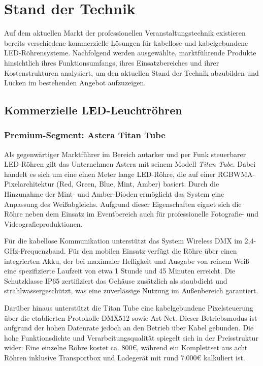 \chapter{Stand der Technik}
\label{chap:stand-der-technik}

Auf dem aktuellen Markt der professionellen Veranstaltungstechnik existieren 
bereits verschiedene kommerzielle Lösungen für kabellose und kabelgebundene LED-Röhrensysteme. 
Nachfolgend werden ausgewählte, marktführende Produkte 
hinsichtlich ihres Funktionsumfangs, ihres Einsatzbereiches und ihrer 
Kostenstrukturen analysiert, um den aktuellen Stand der Technik abzubilden 
und Lücken im bestehenden Angebot aufzuzeigen. 

\section{Kommerzielle LED-Leuchtröhren}
\label{sec:kommerzielle-led-leuchtroehren}

\subsection{Premium-Segment: Astera Titan Tube}
Als gegenwärtiger Marktführer im Bereich autarker und per Funk steuerbarer 
LED-Röhren gilt das Unternehmen Astera mit seinem Modell \textit{Titan Tube}. 
Dabei handelt es sich um eine einen Meter lange LED-Röhre, die auf einer 
RGBWMA-Pixelarchitektur (Red, Green, Blue, Mint, Amber) basiert. Durch die 
Hinzunahme der Mint- und Amber-Dioden ermöglicht das System eine
Anpassung des Weißabgleichs. 
Aufgrund dieser Eigenschaften eignet sich die Röhre neben dem Einsatz im 
Eventbereich auch für professionelle Fotografie- und Videografieproduktionen.

Für die kabellose Kommunikation unterstützt das System Wireless DMX
im 2,4-GHz-Frequenzband. Für den mobilen 
Einsatz verfügt die Röhre über einen integrierten Akku, der bei maximaler 
Helligkeit und Ausgabe von reinem Weiß eine spezifizierte Laufzeit von etwa 
1 Stunde und 45 Minuten erreicht. Die Schutzklasse IP65 zertifiziert das 
Gehäuse zusätzlich als staubdicht und strahlwassergeschützt, was eine 
zuverlässige Nutzung im Außenbereich garantiert.

Darüber hinaus unterstützt die Titan Tube eine
kabelgebundene Pixelsteuerung über die etablierten Protokolle DMX512 sowie 
Art-Net. Dieser Betriebsmodus ist aufgrund der hohen Datenrate jedoch an den Betrieb
über Kabel gebunden. Die hohe Funktionsdichte 
und Verarbeitungsqualität spiegelt sich in der Preisstruktur 
wider: Eine einzelne Röhre kostet ca. 800€, während ein Komplettset 
aus acht Röhren inklusive Transportbox und Ladegerät mit rund 
7.000€ kalkuliert ist.


